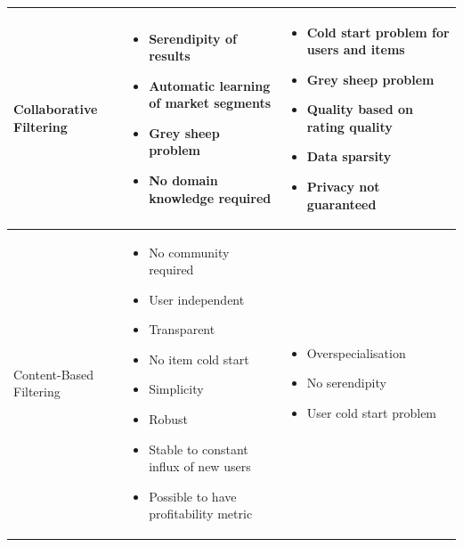 \documentclass{article}
\begin{document}
\begin{table}
    \begin{center}
        \begin{tabularx}{\columnwidth}{X|X|X}
            \hline
            Collaborative Filtering 
            &   \begin{itemize}
                    \item Serendipity of results 
                    \item Automatic learning of market segments
                    \item Grey sheep problem
                    \item No domain knowledge required
                \end{itemize}
            &   \begin{itemize}
                    \item Cold start problem for users and items
                    \item Grey sheep problem
                    \item Quality based on rating quality
                    \item Data sparsity
                    \item Privacy not guaranteed
                \end{itemize} \\
            \hline
            Content-Based Filtering 
            &   \begin{itemize}
                    \item No community required 
                    \item User independent
                    \item Transparent
                    \item No item cold start
                    \item Simplicity
                    \item Robust
                    \item Stable to constant influx of new users
                    \item Possible to have profitability metric
                \end{itemize}
            &   \begin{itemize}
                    \item Overspecialisation
                    \item No serendipity
                    \item User cold start problem

\end{itemize}
\end{tabularx}
\end{center}
\end{table}
\end{document}
